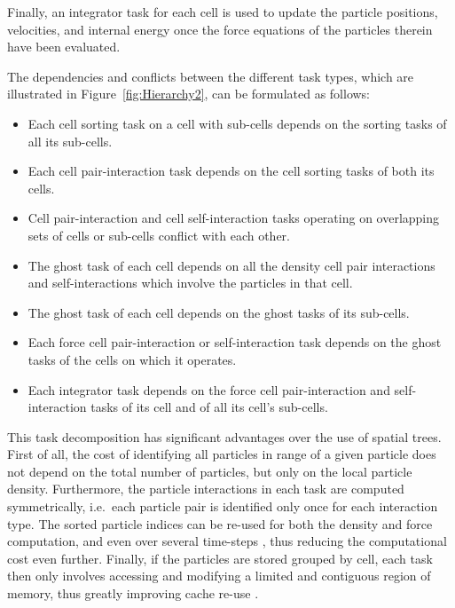 \documentclass[final]{siamltex}
\newcommand{\fig}[1]
    {Figure~\ref{fig:#1}}
\begin{document}
Finally, an integrator task for each cell is used to update the
particle positions, velocities, and internal energy once the force
equations of the particles therein have been evaluated.

The dependencies and conflicts between the different task types,
which are illustrated in \fig{Hierarchy2},
can be formulated as follows:

\begin{itemize}

    \item Each cell sorting task on a cell with sub-cells depends
        on the sorting tasks of all its sub-cells.

    \item Each cell pair-interaction task depends on the cell sorting
        tasks of both its cells.
        
    \item Cell pair-interaction and cell self-interaction tasks
        operating on overlapping sets of cells or sub-cells
        conflict with each other.
        
    \item The ghost task of each cell depends on all the density cell pair
        interactions and self-interactions which involve the particles
        in that cell.
        
    \item The ghost task of each cell depends on the ghost tasks of
        its sub-cells.
        
    \item Each force cell pair-interaction or self-interaction task
        depends on the ghost tasks of the cells on which it operates.
        
    \item Each integrator task depends on the force cell pair-interaction
        and self-interaction tasks of its cell and of all its cell's
        sub-cells.

\end{itemize}

This task decomposition has significant advantages over the use of
spatial trees.
First of all, the cost of identifying all particles in range of
a given particle does not depend on the total number of
particles, but only on the local particle density.
Furthermore, the particle interactions in each task are computed
symmetrically, i.e.~each particle pair is identified only
once for each interaction type.
The sorted particle indices can be re-used for both the
density and force computation, and even over several time-steps
\cite{ref:Gonnet2013}, thus reducing the computational cost even
further.
Finally, if the particles are stored grouped by cell, each task
then only involves accessing and modifying a limited
and contiguous region of memory, thus greatly improving
cache re-use \cite{ref:Fomin2011}.
\end{document}
